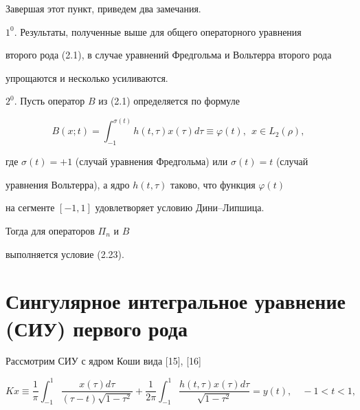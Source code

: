 Завершая этот пункт, приведем два замечания.





$1^0.$ Результаты, полученные выше для общего операторного уравнения


второго рода (2.1), в случае уравнений Фредгольма и Вольтерра второго рода


упрощаются и несколько усиливаются.





$2^0.$ Пусть оператор $B$ из (2.1) определяется по формуле


\begin{equation}


B(x;t)=\int_{-1}^{\sigma(t)}h(t,\tau)x(\tau)d\tau\equiv \varphi(t),\ \ x\in


L_2(\rho),


\end{equation}


где $\sigma(t)=+1$ (случай уравнения Фредгольма) или $\sigma(t)=t$ (случай


уравнения Вольтерра), а ядро $h(t,\tau)$ таково, что функция $\varphi(t)$


на сегменте $[-1,1]$ удовлетворяет условию Дини--Липшица.


Тогда для операторов $\Pi_n$ и $B$


выполняется условие (2.23).








\section{Сингулярное интегральное уравнение (СИУ) первого рода}





Рассмотрим СИУ с ядром Коши вида [15], [16]


\begin{equation}


Kx\equiv


\frac{1}{\pi}\int_{-1}^{1}\frac{x(\tau)d\tau}{(\tau-t)\sqrt{1-\tau^2}}+


\frac{1}{2\pi}\int_{-1}^{1}\frac{h(t,


\tau)x(\tau)d\tau}{\sqrt{1-\tau^2}}=y(t),


\quad -1<t<1,


\end{equation}


